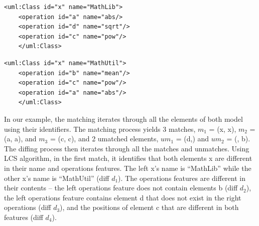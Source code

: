 \documentclass{llncs}
\begin{document}
\vspace{-10pt}
\begin{minipage}[t]{0.49\linewidth} 
    \begin{lstlisting}[style=eol,caption={The simplified XMI of the left model in Fig. \ref{fig:left}.},label=lst:leftxmi]
    <uml:Class id="x" name="MathLib">
    <operation id="a" name="abs/>
    <operation id="d" name="sqrt"/>
    <operation id="c" name="pow"/>
    </uml:Class>
    \end{lstlisting}
\end{minipage}
\hfill
\begin{minipage}[t]{0.49\linewidth}
    \begin{lstlisting}[style=eol,caption={The simplified XMI of the right model in Fig. \ref{fig:right}.},label=lst:rightxmi]
    <uml:Class id="x" name="MathUtil">
    <operation id="b" name="mean"/>
    <operation id="c" name="pow"/>
    <operation id="a" name="abs"/>
    </uml:Class>
    \end{lstlisting}
\end{minipage}

In our example, the matching iterates through all the elements of both model using their identifiers. The matching process yields 3 matches, $m_1$ = (\textsf{x}, \textsf{x}), $m_2$ = (\textsf{a}, \textsf{a}), and $m_3$ = (\textsf{c}, \textsf{c}), and 2 umatched elements, $um_1$ = (\textsf{d},) and $um_2$ = (, \textsf{b}). The diffing process then iterates through all the matches and unmatches. Using LCS algorithm, in the first match, it identifies that both elements \textsf{x} are different in their \textsf{name} and \textsf{operations} features. 
The left \textsf{x}'s \textsf{name} is ``MathLib'' while the other \textsf{x}'s \textsf{name} is ``MathUtil'' (diff $d_1$). The \textsf{operations} features are different in their contents -- the left \textsf{operations} feature does not contain elements \textsf{b} (diff $d_2$), the left \textsf{operations} feature contains element \textsf{d} 
that does not exist in the right \textsf{operations} (diff $d_3$), and the positions of element \textsf{c} that are different in both features (diff $d_4$).
\end{document}
